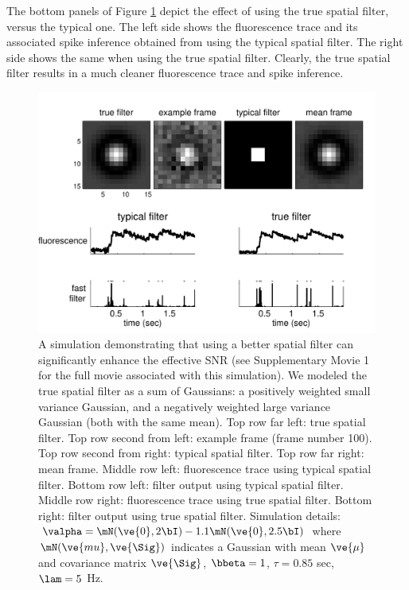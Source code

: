 The bottom panels of Figure \ref{fig:spatial} depict the effect of using the true spatial filter, versus the typical one. The left side shows the fluorescence trace and its associated spike inference obtained from using the typical spatial filter.  The right side shows the same when using the true spatial filter.  Clearly, the true spatial filter results in a much cleaner fluorescence trace and spike inference.  


\begin{figure}[h!]
\centering \includegraphics[width=.9\linewidth]{../figs/spatial2}
\caption{A simulation demonstrating that using a better spatial filter can significantly enhance the effective SNR (see Supplementary Movie 1 for the full movie associated with this simulation). We modeled the true spatial filter as a sum of Gaussians: a positively weighted small variance Gaussian, and a negatively weighted large variance Gaussian (both with the same mean).  Top row far left: true spatial filter.  Top row second from left: example frame (frame number 100). Top row second from right: typical spatial filter.   Top row far right: mean frame.  Middle row left: fluorescence trace using typical spatial filter. Bottom row left: \foopsi filter output using typical spatial filter.  Middle row right: fluorescence trace using true spatial filter.  Bottom right: \foopsi filter output using true spatial filter. Simulation details: $\valpha=\mN(\ve{0},2 \bI)-1.1 \mN(\ve{0},2.5 \bI)$ where $\mN(\ve{mu},\ve{\Sig})$ indicates a Gaussian with mean $\ve{\mu}$ and covariance matrix $\ve{\Sig}$, $\bbeta=1$, $\tau=0.85$ sec, $\lam=5$ Hz.} \label{fig:spatial} 
\end{figure}



